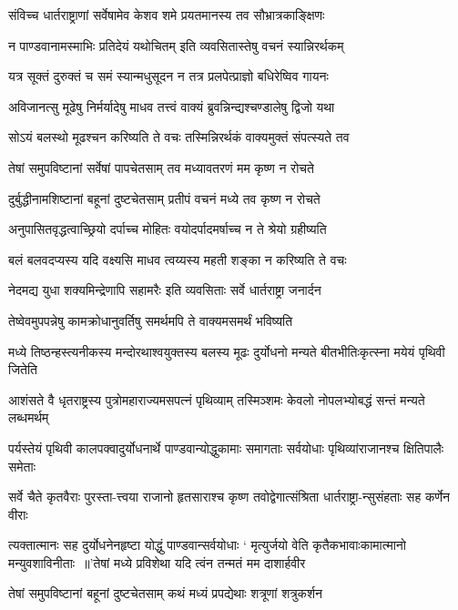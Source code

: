 \twolineshloka
{संविच्च धार्तराष्ट्राणां सर्वेषामेव केशव}
{शमे प्रयतमानस्य तव सौभ्रात्रकाङ्क्षिणः}


\twolineshloka
{न पाण्डवानामस्माभिः प्रतिदेयं यथोचितम्}
{इति व्यवसितास्तेषु वचनं स्यान्निरर्थकम्}


\twolineshloka
{यत्र सूक्तं दुरुक्तं च समं स्यान्मधुसूदन}
{न तत्र प्रलपेत्प्राज्ञो बधिरेष्विव गायनः}


\twolineshloka
{अविजानत्सु मूढेषु निर्मर्यादेषु माधव}
{तत्त्वं वाक्यं ब्रुवन्निन्द्यश्चण्डालेषु द्विजो यथा}


\twolineshloka
{सोऽयं बलस्थो मूढश्चन करिष्यति ते वचः}
{तस्मिन्निरर्थकं वाक्यमुक्तं संपत्स्यते तव}


\twolineshloka
{तेषां समुपविष्टानां सर्वेषां पापचेतसाम्}
{तव मध्यावतरणं मम कृष्ण न रोचते}


\twolineshloka
{दुर्बुद्धीनामशिष्टानां बहूनां दुष्टचेतसाम्}
{प्रतीपं वचनं मध्ये तव कृष्ण न रोचते}


\twolineshloka
{अनुपासितवृद्धत्वाच्छ्रियो दर्पाच्च मोहितः}
{वयोदर्पादमर्षाच्च न ते श्रेयो ग्रहीष्यति}


\twolineshloka
{बलं बलवदप्यस्य यदि वक्ष्यसि माधव}
{त्वय्यस्य महती शङ्का न करिष्यति ते वचः}


\twolineshloka
{नेदमद्य युधा शक्यमिन्द्रेणापि सहामरैः}
{इति व्यवसिताः सर्वे धार्तराष्ट्रा जनार्दन}


\twolineshloka
{तेष्वेवमुपपन्नेषु कामक्रोधानुवर्तिषु}
{समर्थमपि ते वाक्यमसमर्थं भविष्यति}


\twolineshloka
{मध्ये तिष्ठन्हस्त्यनीकस्य मन्दोरथाश्वयुक्तस्य बलस्य मूढः}
{दुर्योधनो मन्यते बीतभीतिःकृत्स्ना मयेयं पृथिवी जितेति}


\twolineshloka
{आशंसते वै धृतराष्ट्रस्य पुत्रोमहाराज्यमसपत्नं पृथिव्याम्}
{तस्मिञ्शमः केवलो नोपलभ्योबद्धं सन्तं मन्यते लब्धमर्थम्}


\twolineshloka
{पर्यस्तेयं पृथिवी कालपक्वादुर्योधनार्थे पाण्डवान्योद्धुकामाः}
{समागताः सर्वयोधाः पृथिव्यांराजानश्च क्षितिपालैः समेताः}


\twolineshloka
{सर्वे चैते कृतवैराः पुरस्ता-त्त्वया राजानो हृतसाराश्च कृष्ण}
{तवोद्वेगात्संश्रिता धार्तराष्ट्रा-न्सुसंहताः सह कर्णेन वीराः}


\twolineshloka
{त्यक्तात्मानः सह दुर्योधनेनहृष्टा योद्धुं पाण्डवान्सर्वयोधाः}
{` मृत्युर्जयो वेति कृतैकभावाःकामात्मानो मन्युवशाविनीताः ॥'तेषां मध्ये प्रविशेथा यदि त्वंन तन्मतं मम दाशार्हवीर}


\twolineshloka
{तेषां समुपविष्टानां बहूनां दुष्टचेतसाम्}
{कथं मध्यं प्रपद्येथाः शत्रूणां शत्रुकर्शन}


